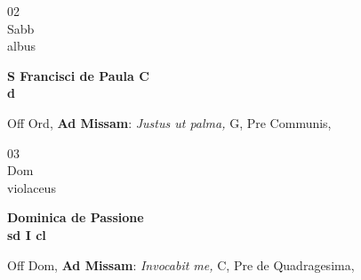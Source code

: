\documentclass[10pt, openany]{book}
\begin{document}
        \begin{center}
            \begin{minipage}{3.5in}
                \vspace{2em}
                \begin{minipage}{0.5in}
                    {\Huge 02} \\
                    {\normalsize Sabb} \\
                    {\normalsize albus}
                \end{minipage}
                \begin{minipage}{3.0in}
                    \textbf{ \large S Francisci de Paula C \\
                    \textnormal{\normalsize d}} \\ 
                \end{minipage}
                \begin{justify}Off Ord, \textbf{Ad Missam}: \textit{Justus ut palma,} G, Pre Communis,   
                \end{justify}
            \end{minipage}
        \end{center}
    
        \begin{center}
            \begin{minipage}{3.5in}
                \vspace{2em}
                \begin{minipage}{0.5in}
                    {\Huge 03} \\
                    {\normalsize Dom} \\
                    {\normalsize violaceus}
                \end{minipage}
                \begin{minipage}{3.0in}
                    \textbf{ \large Dominica de Passione \\
                    \textnormal{\normalsize sd I cl}} \\ 
                \end{minipage}
                \begin{justify}Off Dom, \textbf{Ad Missam}: \textit{Invocabit me,} C, Pre de Quadragesima,   
                \end{justify}
            \end{minipage}
        \end{center}
    
\end{document}
